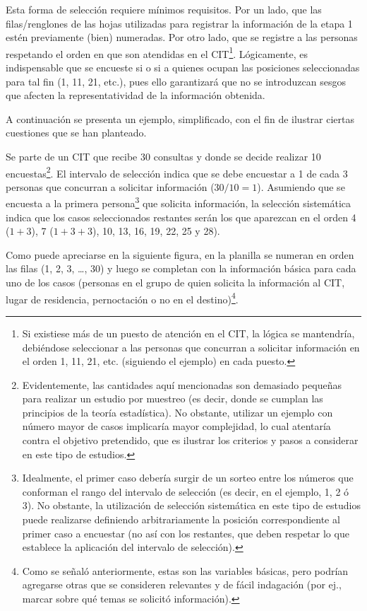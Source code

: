\documentclass[
]{book}
\begin{document}
Esta forma de selección requiere mínimos requisitos. Por un lado, que las filas/renglones de las hojas utilizadas para registrar la información de la etapa 1 estén previamente (bien) numeradas. Por otro lado, que se registre a las personas respetando el orden en que son atendidas en el CIT\footnote{Si existiese más de un puesto de atención en el CIT, la lógica se mantendría, debiéndose seleccionar a las personas que concurran a solicitar información en el orden 1, 11, 21, etc. (siguiendo el ejemplo) en cada puesto.}. Lógicamente, es indispensable que se encueste si o si a quienes ocupan las posiciones seleccionadas para tal fin (1, 11, 21, etc.), pues ello garantizará que no se introduzcan sesgos que afecten la representatividad de la información obtenida.

A continuación se presenta un ejemplo, simplificado, con el fin de ilustrar ciertas cuestiones que se han planteado.

Se parte de un CIT que recibe 30 consultas y donde se decide realizar 10 encuestas\footnote{Evidentemente, las cantidades aquí mencionadas son demasiado pequeñas para realizar un estudio por muestreo (es decir, donde se cumplan las principios de la teoría estadística). No obstante, utilizar un ejemplo con número mayor de casos implicaría mayor complejidad, lo cual atentaría contra el objetivo pretendido, que es ilustrar los criterios y pasos a considerar en este tipo de estudios.}. El intervalo de selección indica que se debe encuestar a 1 de cada 3 personas que concurran a solicitar información (\(30/10=1\)). Asumiendo que se encuesta a la primera persona\footnote{Idealmente, el primer caso debería surgir de un sorteo entre los números que conforman el rango del intervalo de selección (es decir, en el ejemplo, 1, 2 ó 3). No obstante, la utilización de selección sistemática en este tipo de estudios puede realizarse definiendo arbitrariamente la posición correspondiente al primer caso a encuestar (no así con los restantes, que deben respetar lo que establece la aplicación del intervalo de selección).} que solicita información, la selección sistemática indica que los casos seleccionados restantes serán los que aparezcan en el orden 4 (\(1+3\)), 7 (\(1+3+3\)), 10, 13, 16, 19, 22, 25 y 28).

Como puede apreciarse en la siguiente figura, en la planilla se numeran en orden las filas (1, 2, 3, \ldots, 30) y luego se completan con la información básica para cada uno de los casos (personas en el grupo de quien solicita la información al CIT, lugar de residencia, pernoctación o no en el destino)\footnote{Como se señaló anteriormente, estas son las variables básicas, pero podrían agregarse otras que se consideren relevantes y de fácil indagación (por ej., marcar sobre qué temas se solicitó información).}.
\end{document}
